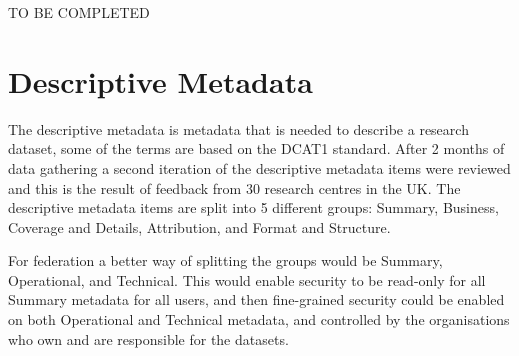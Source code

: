 \documentclass{article}
\begin{document}
TO BE COMPLETED
\newpage
\section{Descriptive Metadata}
The descriptive metadata is metadata that is needed to describe a research dataset, some of the terms are based on the  DCAT1 standard. After 2 months of data gathering a second iteration of the descriptive metadata items were reviewed and this is the result of feedback from 30 research centres in the UK. The descriptive metadata items are split into 5 different groups: Summary, Business, Coverage and Details, Attribution, and Format and Structure. 

For federation a better way of splitting the groups would be Summary, Operational, and Technical. This would enable security to be read-only for all Summary metadata for all users, and then fine-grained security could be enabled on both Operational and Technical metadata, and controlled by the organisations who own and are responsible for the datasets.
\end{document}
